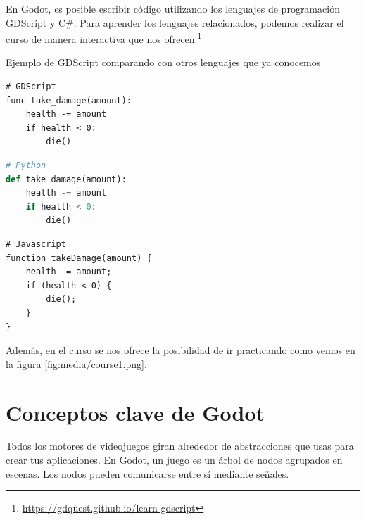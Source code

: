 \documentclass[12pt]{book} %
\begin{document}
En Godot, es posible escribir código utilizando los lenguajes de
programación GDScript y C\#. Para aprender los lenguajes relacionados,
podemos realizar el curso de manera interactiva que nos
ofrecen.\footnote{\url{https://gdquest.github.io/learn-gdscript}}

Ejemplo de GDScript comparando con otros lenguajes que ya conocemos

\begin{lstlisting}
# GDScript
func take_damage(amount):
    health -= amount
    if health < 0:
        die()
\end{lstlisting}

\begin{lstlisting}[language=Python]
# Python
def take_damage(amount):
    health -= amount
    if health < 0:
        die()
\end{lstlisting}

\begin{lstlisting}
# Javascript
function takeDamage(amount) {
    health -= amount;
    if (health < 0) {
        die();
    }
}
\end{lstlisting}

Además, en el curso se nos ofrece la posibilidad de ir practicando como
vemos en la figura \ref{fig:media/course1.png}.


\hypertarget{conceptos-clave-de-godot}{%
\section{Conceptos clave de Godot}\label{conceptos-clave-de-godot}}

Todos los motores de videojuegos giran alrededor de abstracciones que
usas para crear tus aplicaciones. En Godot, un juego es un árbol de
nodos agrupados en escenas. Los nodos pueden comunicarse entre sí
mediante señales.
\end{document}
